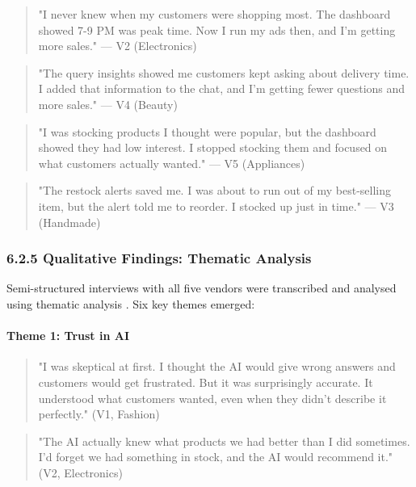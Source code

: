 \documentclass[12pt,a4paper]{article}
\begin{document}
\begin{quote}
"I never knew when my customers were shopping most. The dashboard showed 7-9 PM was peak time. Now I run my ads then, and I'm getting more sales." --- V2 (Electronics)
\end{quote}

\begin{quote}
"The query insights showed me customers kept asking about delivery time. I added that information to the chat, and I'm getting fewer questions and more sales." --- V4 (Beauty)
\end{quote}

\begin{quote}
"I was stocking products I thought were popular, but the dashboard showed they had low interest. I stopped stocking them and focused on what customers actually wanted." --- V5 (Appliances)
\end{quote}

\begin{quote}
"The restock alerts saved me. I was about to run out of my best-selling item, but the alert told me to reorder. I stocked up just in time." --- V3 (Handmade)
\end{quote}

\subsubsection{6.2.5 Qualitative Findings: Thematic Analysis}

Semi-structured interviews with all five vendors were transcribed and analysed using thematic analysis \citep{braun2006}. Six key themes emerged:

\paragraph{Theme 1: Trust in AI}

\begin{quote}
"I was skeptical at first. I thought the AI would give wrong answers and customers would get frustrated. But it was surprisingly accurate. It understood what customers wanted, even when they didn't describe it perfectly." (V1, Fashion)
\end{quote}

\begin{quote}
"The AI actually knew what products we had better than I did sometimes. I'd forget we had something in stock, and the AI would recommend it." (V2, Electronics)
\end{quote}
\end{document}
